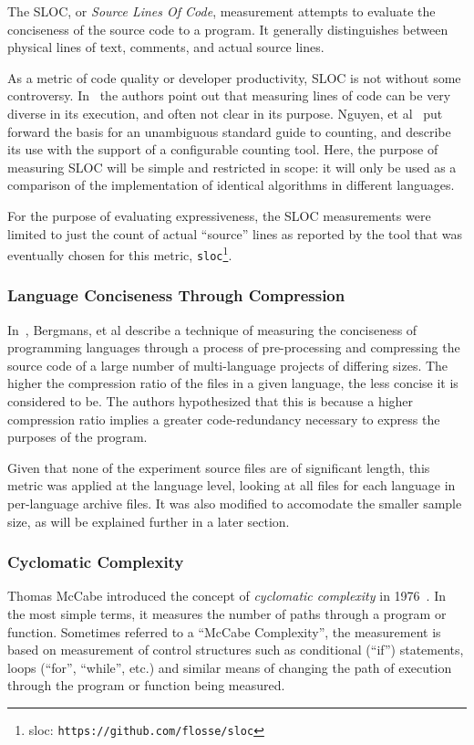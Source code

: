 The SLOC, or \textit{Source Lines Of Code}, measurement attempts to evaluate the conciseness of the source code to a program. It generally distinguishes between physical lines of text, comments, and actual source lines.

As a metric of code quality or developer productivity, SLOC is not without some controversy. In~\cite{alpernas} the authors point out that measuring lines of code can be very diverse in its execution, and often not clear in its purpose. Nguyen, et al~\cite{nguyen} put forward the basis for an unambiguous standard guide to counting, and describe its use with the support of a configurable counting tool. Here, the purpose of measuring SLOC will be simple and restricted in scope: it will only be used as a comparison of the implementation of identical algorithms in different languages.

For the purpose of evaluating expressiveness, the SLOC measurements were limited to just the count of actual ``source'' lines as reported by the tool that was eventually chosen for this metric, \texttt{sloc}\footnote{sloc: \texttt{https://github.com/flosse/sloc}}.

\subsubsection{Language Conciseness Through Compression}

In~\cite{bergmans}, Bergmans, et al describe a technique of measuring the conciseness of programming languages through a process of pre-processing and compressing the source code of a large number of multi-language projects of differing sizes. The higher the compression ratio of the files in a given language, the less concise it is considered to be. The authors hypothesized that this is because a higher compression ratio implies a greater code-redundancy necessary to express the purposes of the program.

Given that none of the experiment source files are of significant length, this metric was applied at the language level, looking at all files for each language in per-language archive files. It was also modified to accomodate the smaller sample size, as will be explained further in a later section.

\subsubsection{Cyclomatic Complexity}

Thomas McCabe introduced the concept of \textit{cyclomatic complexity} in 1976~\cite{mccabe}. In the most simple terms, it measures the number of paths through a program or function. Sometimes referred to a ``McCabe Complexity'', the measurement is based on measurement of control structures such as conditional (``if'') statements, loops (``for'', ``while'', etc.) and similar means of changing the path of execution through the program or function being measured.

